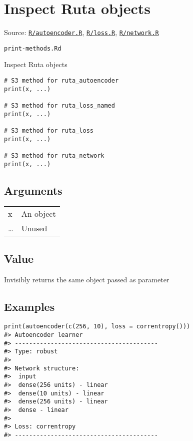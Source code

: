 \section{Inspect Ruta objects}\label{inspect-ruta-objects}

Source:
\href{https://github.com/fdavidcl/ruta/blob/master/R/autoencoder.R}{\texttt{R/autoencoder.R}},
\href{https://github.com/fdavidcl/ruta/blob/master/R/loss.R}{\texttt{R/loss.R}},
\href{https://github.com/fdavidcl/ruta/blob/master/R/network.R}{\texttt{R/network.R}}

\texttt{print-methods.Rd}

Inspect Ruta objects

\begin{verbatim}
# S3 method for ruta_autoencoder
print(x, ...)

# S3 method for ruta_loss_named
print(x, ...)

# S3 method for ruta_loss
print(x, ...)

# S3 method for ruta_network
print(x, ...)
\end{verbatim}

\hypertarget{arguments}{\subsection{\texorpdfstring{\protect\hyperlink{arguments}{}Arguments}{Arguments}}\label{arguments}}

\begin{longtable}[c]{@{}>{\small}p{3cm}>{\raggedright}p{12.5cm}@{}}
\toprule
x & An object\tabularnewline
\ldots{} & Unused\tabularnewline
\bottomrule
\end{longtable}

\hypertarget{value}{\subsection{\texorpdfstring{\protect\hyperlink{value}{}Value}{Value}}\label{value}}

Invisibly returns the same object passed as parameter

\hypertarget{examples}{\subsection{\texorpdfstring{\protect\hyperlink{examples}{}Examples}{Examples}}\label{examples}}

\begin{verbatim}
print(autoencoder(c(256, 10), loss = correntropy()))
#> Autoencoder learner
#> ----------------------------------------
#> Type: robust 
#> 
#> Network structure:
#>  input
#>  dense(256 units) - linear
#>  dense(10 units) - linear
#>  dense(256 units) - linear
#>  dense - linear
#> 
#> Loss: correntropy 
#> ----------------------------------------
\end{verbatim}

